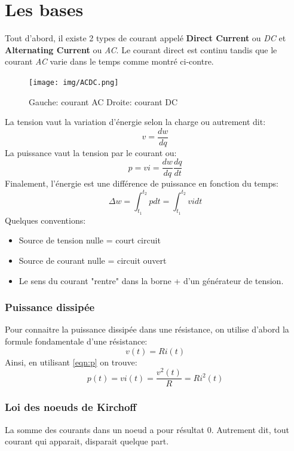 \documentclass{report}
\begin{document}
\section{Les bases}

Tout d'abord, il existe 2 types de courant appelé \textbf{Direct Current} ou \textit{DC} et \textbf{Alternating Current} ou \textit{AC}. Le courant direct est continu tandis que le courant \textit{AC} varie dans le temps comme montré ci-contre.\\
\begin{figure}[H]
	\centering
	\texttt{[image: img/ACDC.png]}
	\caption{Gauche: courant AC \quad Droite: courant DC}
\end{figure}
La tension vaut la variation d'énergie selon la charge ou autrement dit: 
\begin{equation}
v = \frac{dw}{dq}
\end{equation}
La puissance vaut la tension par le courant ou:
\begin{equation} \label{eqn:p}
p = vi = \frac{dw}{dq}\frac{dq}{dt}
\end{equation}
Finalement, l'énergie est une différence de puissance en fonction du temps:
\begin{equation}
\Delta w = \int_{t_1}^{t_2}p dt = \int_{t_1}^{t_2} vi dt
\end{equation}
Quelques conventions:
\begin{itemize}
\item Source de tension nulle = court circuit
\item Source de courant nulle = circuit ouvert
\item Le sens du courant "rentre" dans la borne + d'un générateur de tension.
\end{itemize}
\subsubsection{Puissance dissipée}
Pour connaitre la puissance dissipée dans une résistance, on utilise d'abord la formule fondamentale d'une résistance:
\begin{equation}
v(t) = R i(t)
\end{equation}
Ainsi, en utilisant \ref{eqn:p} on trouve:
\begin{equation} \label{eqn:pr}
p(t) = vi(t) = \frac{v^2(t)}{R} = Ri^2(t)
\end{equation}

\subsubsection{Loi des noeuds de Kirchoff}
La somme des courants dans un noeud a pour résultat 0. Autrement dit, tout courant qui apparait, disparait quelque part.
\end{document}
